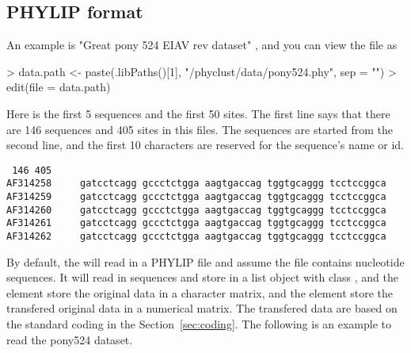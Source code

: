 \subsection[PHYLIP format]{PHYLIP format}
\label{sec:phylip}

An example is "Great pony 524 EIAV rev dataset" \citep{Baccam2003},
and you can view the file as
\begin{Code}
> data.path <- paste(.libPaths()[1], "/phyclust/data/pony524.phy", sep = "")
> edit(file = data.path)
\end{Code}
Here is the first 5 sequences and the first 50 sites. The first line
says that there are 146 sequences and 405 sites in this files. The sequences
are started from the second line, and the first 10 characters are reserved for
the sequence's name or id.
\begin{verbatim}
 146 405
AF314258     gatcctcagg gccctctgga aagtgaccag tggtgcaggg tcctccggca
AF314259     gatcctcagg gccctctgga aagtgaccag tggtgcaggg tcctccggca
AF314260     gatcctcagg gccctctgga aagtgaccag tggtgcaggg tcctccggca
AF314261     gatcctcagg gccctctgga aagtgaccag tggtgcaggg tcctccggca
AF314262     gatcctcagg gccctctgga aagtgaccag tggtgcaggg tcctccggca
\end{verbatim}

By default, the  will read in a PHYLIP file and
assume the file contains nucleotide sequences. It will read in sequences
and store in a list object with class , and the element
 store the original data in a character matrix, and
the element  store the transfered original data in a numerical
matrix. The transfered data are based on the standard coding in
the Section~\ref{sec:coding}.
The following is an example to read the pony524 dataset.

